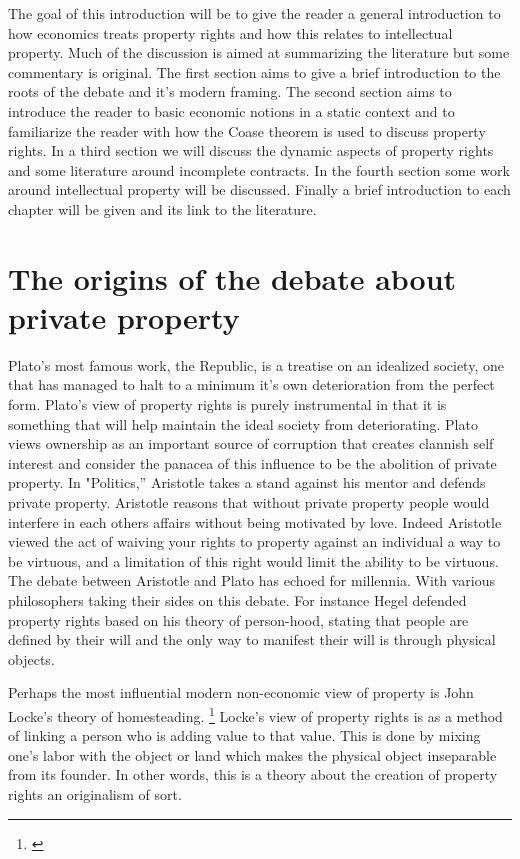 \documentclass[12pt]{article}
\numberwithin{equation}{section}
\begin{document}
The goal of this introduction will be to give the reader a general introduction to how economics treats property rights and how this relates to intellectual property. Much of the discussion is aimed at summarizing the literature but some commentary is original. The first section aims to give a brief introduction to the roots of the debate and it's modern framing. The second section aims to introduce the reader to basic economic notions in a static context and to familiarize the reader with how the Coase theorem is used to discuss property rights. In a third section we will discuss the dynamic aspects of property rights and some literature around incomplete contracts. In the fourth section some work around intellectual property will be discussed. Finally a brief introduction to each chapter will be given and its link to the literature.


\section{The origins of the debate about private property}

Plato's most famous work, the Republic, is a treatise on an idealized society, one that has managed to halt to a minimum it's own deterioration from the perfect form. Plato's view of property rights is purely instrumental in that it is something that will help maintain the ideal society from deteriorating. Plato views ownership as an important source of corruption that creates clannish self interest and consider the panacea of this influence to be the abolition of private property.
In "Politics,'' Aristotle takes a stand against his mentor and defends private property. Aristotle reasons that without private property people would interfere in each others affairs without being motivated by love. Indeed Aristotle viewed the act of waiving your rights to property against an individual a way to be virtuous, and a limitation of this right would limit the ability to be virtuous. The debate between Aristotle and Plato has echoed for millennia. With various philosophers taking their sides on this debate. For instance Hegel defended property rights based on his theory of person-hood, stating that people are defined by their will and the only way to manifest their will is through physical objects.

Perhaps the most influential modern non-economic view of property is John Locke's theory of homesteading. \footnote{\cite{locke2014second}} Locke's view of property rights is as a method of linking a person who is adding value to that value. This is done by mixing one's labor with the object or land which makes the physical object inseparable from its founder. In other words, this is a theory about the creation of property rights an originalism of sort.
\end{document}
